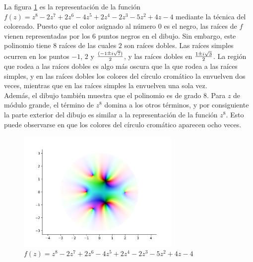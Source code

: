 La figura \ref{fig:z^8-2z^7+2z^6-4z^5+2z^4-2z^3-5z^2+4z-4} es la representación de la función $f(z) = z^8-2z^7+2z^6-4z^5+2z^4-2z^3-5z^2+4z-4$ mediante la técnica del coloreado. Puesto que el color asignado al número $0$ es el negro, las raíces de $f$ vienen representadas por los $6$ puntos negros en el dibujo. Sin embargo, este polinomio tiene $8$ raíces de las cuales $2$ son raíces dobles. Las raíces simples ocurren en los puntos $-1$, $2$ y $\frac{(-1 \rpm i \sqrt{7})}{2}$, y las raíces dobles en $\frac{1 \rpm i \sqrt{3}}{2}$.  La región que rodea a las raíces dobles es algo más oscura que la que rodea a las raíces simples, y en las raíces dobles los colores del círculo cromático la envuelven dos veces, mientras que en las raíces simples la envuelven una sola vez. \\

Además, el dibujo también muestra que el polinomio es de grado $8$. Para $z$ de módulo grande, el término de $z^8$ domina a los otros términos, y por consiguiente la parte exterior del dibujo es similar a la representación de la función $z^8$. Esto puede observarse en que los colores del círculo cromático aparecen ocho veces. \\

\begin{figure}[h]
    \centering
    \includegraphics[width=0.7\textwidth]{../Aplicacion/z^8-2z^7+2z^6-4z^5+2z^4-2z^3-5z^2+4z-4.png}
    \caption{$f(z) = z^8-2z^7+2z^6-4z^5+2z^4-2z^3-5z^2+4z-4$}
    \label{fig:z^8-2z^7+2z^6-4z^5+2z^4-2z^3-5z^2+4z-4}
\end{figure}



